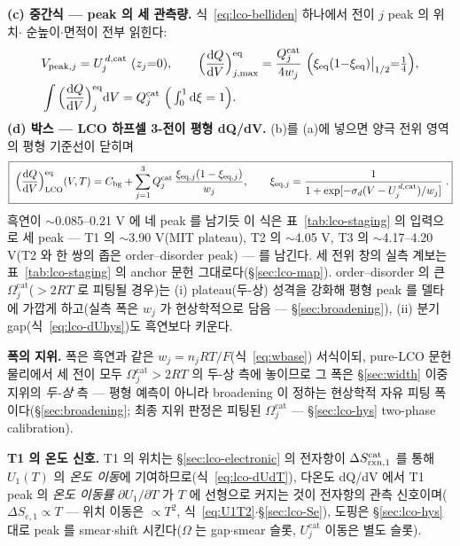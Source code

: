 \textbf{(c) 중간식 --- peak 의 세 관측량.} 식~\eqref{eq:lco-belliden} 하나에서 전이 $j$ peak 의 위치$\cdot$
순높이$\cdot$면적이 전부 읽힌다:
\begin{equation}
\begin{aligned}
&V_{\mathrm{peak},j}=U_j^{\,d,\mathrm{cat}}\ (z_j{=}0),\qquad
\Big(\frac{\dd Q}{\dd V}\Big)^{\eq}_{j,\max}=\frac{Q_j^\mathrm{cat}}{4w_j}\ \Big(\xi_\eq(1{-}\xi_\eq)\big|_{1/2}{=}\tfrac14\Big),\\
&\int\Big(\frac{\dd Q}{\dd V}\Big)^{\eq}_{j}\dd V=Q_j^\mathrm{cat}\ \Big(\textstyle\int_0^1\dd\xi=1\Big).
\end{aligned}
\label{eq:lco-peakobs}
\end{equation}
\textbf{(d) 박스 --- LCO 하프셀 3-전이 평형 dQ/dV.} (b)를 (a)에 넣으면 양극 전위 영역의 평형 기준선이 닫히며
\begin{equation}
\boxed{\;\Big(\frac{\mathrm{d} Q}{\mathrm{d} V}\Big)^{\mathrm{eq}}_\mathrm{LCO}(V,T)
=C_{\mathrm{bg}}+\sum_{j=1}^{3}Q_j^\mathrm{cat}\,
\frac{\xi_{\mathrm{eq},j}(1-\xi_{\mathrm{eq},j})}{w_j},
\qquad \xi_{\mathrm{eq},j}=\frac{1}{1+\exp[-\sigma_d(V-U_j^{\,d,\mathrm{cat}})/w_j]}\;.}
\label{eq:lco-eqpeak}
\end{equation}
흑연이 $\sim$0.085--0.21 V 에 네 peak 를 남기듯 이 식은 표~\ref{tab:lco-staging} 의 입력으로 세 peak ---
T1 의 $\sim$3.90 V(MIT plateau), T2 의 $\sim$4.05 V, T3 의 $\sim$4.17--4.20 V(T2 와 한 쌍의 좁은
order--disorder peak) --- 를 남긴다. 세 전위 창의 실측 계보는 표~\ref{tab:lco-staging} 의 anchor
문헌\cite{xia2007,reynier2004,motohashi2009} 그대로다(\S\ref{sec:lco-map}). order--disorder 의 큰 $\Omega_j^\mathrm{cat}$($>2RT$ 로 피팅될 경우)는
(i) plateau(두-상) 성격을 강화해 평형 peak 를 델타에 가깝게 하고(실측 폭은 $w_j$ 가 현상학적으로 담음 ---
\S\ref{sec:broadening}), (ii) 분기 gap(식~\eqref{eq:lco-dUhys})도 흑연보다 키운다.

\textbf{폭의 지위.} 폭은 흑연과 같은 $w_j=n_jRT/F$(식~\eqref{eq:wbase}) 서식이되, pure-LCO 문헌 물리에서 세
전이 모두 $\Omega_j^\mathrm{cat}>2RT$ 의 두-상 측에 놓이므로 그 폭은 \S\ref{sec:width} 이중지위의
\emph{두-상} 측 --- 평형 예측이 아니라 broadening 이 정하는 현상학적 자유 피팅 폭이다(\S\ref{sec:broadening};
최종 지위 판정은 피팅된 $\Omega_j^\mathrm{cat}$ --- \S\ref{sec:lco-hys} two-phase calibration).

\textbf{T1 의 온도 신호.} T1 의 위치는 \S\ref{sec:lco-electronic} 의 전자항이 $\Delta S_{\mathrm{rxn},1}^\mathrm{cat}$ 를 통해 $U_1(T)$ 의
\emph{온도 이동}에 기여하므로(식~\eqref{eq:lco-dUdT}), 다온도 dQ/dV 에서 T1 peak 의 \emph{온도 이동률}
$\partial U_1/\partial T$ 가 $T$ 에 선형으로 커지는 것이 전자항의 관측 신호이며($\Delta S_{e,1}\propto T$ ---
위치 이동은 $\propto T^2$, 식~\eqref{eq:U1T2}$\cdot$\S\ref{sec:lco-Se}), 도핑은 \S\ref{sec:lco-hys} 대로 peak 를 smear$\cdot$shift 시킨다($\Omega$ 는
gap$\cdot$smear 슬롯, $U_j^\mathrm{cat}$ 이동은 별도 슬롯).

